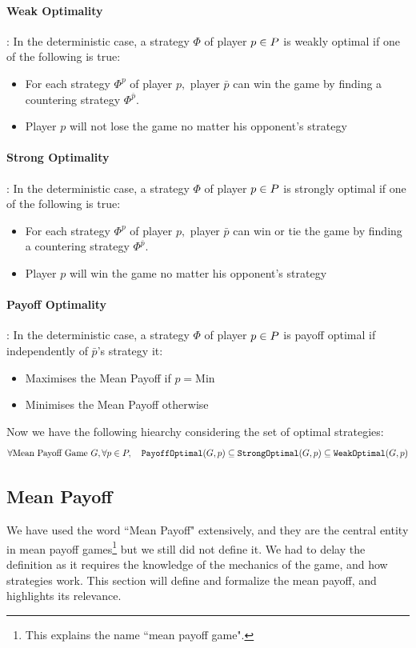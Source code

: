 \paragraph{Weak Optimality}: In the deterministic case, a strategy $\Phi$ of player $p\in P$ is weakly optimal if one of the following is true:
\begin{itemize}
	\item For each strategy $\Phi^{p}$ of player $p,$ player $\bar{p}$ can win the game by finding a countering strategy $\Phi^{\bar{p}}.$
	\item Player $p$ will not lose the game no matter his opponent's strategy
\end{itemize}

\paragraph{Strong Optimality}: In the deterministic case, a strategy $\Phi$ of player $p\in P$ is strongly optimal if one of the following is true:
\begin{itemize}
	\item For each strategy $\Phi^{p}$ of player $p,$ player $\bar{p}$ can win or tie the game by finding a countering strategy $\Phi^{\bar{p}}.$
	\item Player $p$ will win the game no matter his opponent's strategy
\end{itemize}

\paragraph{Payoff Optimality}: In the deterministic case, a strategy $\Phi$ of player $p\in P$ is payoff optimal if independently of $\bar{p}$'s strategy it:
\begin{itemize}
	\item Maximises the Mean Payoff if $p=\text{Min}$ 
	\item Minimises the Mean Payoff otherwise
\end{itemize}
Now we have the following hiearchy considering the set of optimal strategies:
$$
\forall \text{Mean Payoff Game}\ G,\forall p\in P,\quad \operatorname{\mathtt{PayoffOptimal}}(G,p) \subseteq \operatorname{\mathtt{StrongOptimal}}(G,p) \subseteq \operatorname{\mathtt{WeakOptimal}}(G,p)
$$
\subsection{Mean Payoff}
\label{section:Formalisation:MeanPayoff}
We have used the word ``Mean Payoff" extensively, and they are the central entity in mean payoff games\footnote{This explains the name ``mean payoff game".} but we still did not define it.
\newline We had to delay the definition as it requires the knowledge of the mechanics of the game, and how strategies work. This section will define and formalize the mean payoff, and highlights its relevance.
